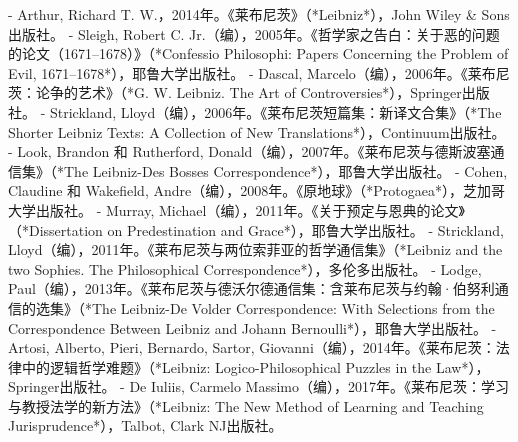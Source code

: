\begin{itemize}
- Arthur, Richard T. W.，2014年。《莱布尼茨》（*Leibniz*），John Wiley & Sons出版社。
- Sleigh, Robert C. Jr.（编），2005年。《哲学家之告白：关于恶的问题的论文（1671–1678）》（*Confessio Philosophi: Papers Concerning the Problem of Evil, 1671–1678*），耶鲁大学出版社。
- Dascal, Marcelo（编），2006年。《莱布尼茨：论争的艺术》（*G. W. Leibniz. The Art of Controversies*），Springer出版社。
- Strickland, Lloyd（编），2006年。《莱布尼茨短篇集：新译文合集》（*The Shorter Leibniz Texts: A Collection of New Translations*），Continuum出版社。
- Look, Brandon 和 Rutherford, Donald（编），2007年。《莱布尼茨与德斯波塞通信集》（*The Leibniz-Des Bosses Correspondence*），耶鲁大学出版社。
- Cohen, Claudine 和 Wakefield, Andre（编），2008年。《原地球》（*Protogaea*），芝加哥大学出版社。
- Murray, Michael（编），2011年。《关于预定与恩典的论文》（*Dissertation on Predestination and Grace*），耶鲁大学出版社。
- Strickland, Lloyd（编），2011年。《莱布尼茨与两位索菲亚的哲学通信集》（*Leibniz and the two Sophies. The Philosophical Correspondence*），多伦多出版社。
- Lodge, Paul（编），2013年。《莱布尼茨与德沃尔德通信集：含莱布尼茨与约翰·伯努利通信的选集》（*The Leibniz-De Volder Correspondence: With Selections from the Correspondence Between Leibniz and Johann Bernoulli*），耶鲁大学出版社。
- Artosi, Alberto, Pieri, Bernardo, Sartor, Giovanni（编），2014年。《莱布尼茨：法律中的逻辑哲学难题》（*Leibniz: Logico-Philosophical Puzzles in the Law*），Springer出版社。
- De Iuliis, Carmelo Massimo（编），2017年。《莱布尼茨：学习与教授法学的新方法》（*Leibniz: The New Method of Learning and Teaching Jurisprudence*），Talbot, Clark NJ出版社。  
\end{itemize}